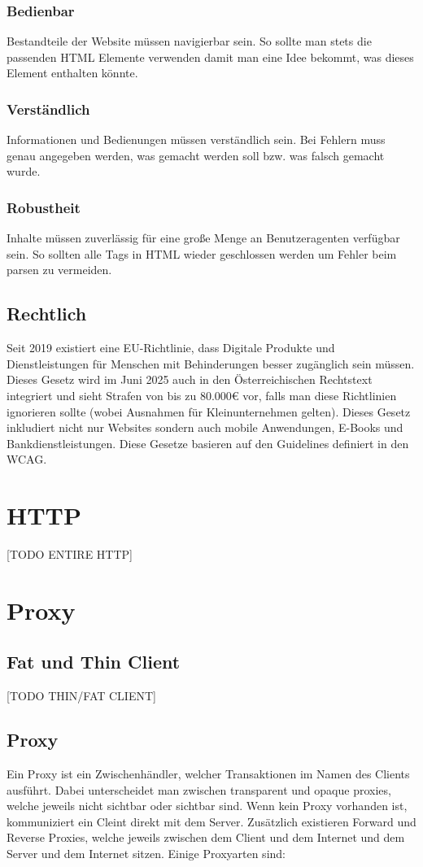\documentclass{article}
\begin{document}
\begin{itemize}
	\subsubsection{Bedienbar}
	Bestandteile der Website müssen navigierbar sein. So sollte man stets die passenden HTML Elemente verwenden damit man eine Idee bekommt, was dieses Element enthalten könnte.
	\subsubsection{Verständlich}
	Informationen und Bedienungen müssen verständlich sein. Bei Fehlern muss genau angegeben werden, was gemacht werden soll bzw. was falsch gemacht wurde.
	\subsubsection{Robustheit}
	Inhalte müssen zuverlässig für eine große Menge an Benutzeragenten verfügbar sein. So sollten alle Tags in HTML wieder geschlossen werden um Fehler beim parsen zu vermeiden.
	\subsection{Rechtlich}
	Seit 2019 existiert eine EU-Richtlinie, dass Digitale Produkte und Dienstleistungen für Menschen mit Behinderungen besser zugänglich sein müssen. Dieses Gesetz wird im Juni 2025 auch in den Österreichischen Rechtstext integriert und sieht Strafen von bis zu 80.000€ vor, falls man diese Richtlinien ignorieren sollte (wobei Ausnahmen für Kleinunternehmen gelten). Dieses Gesetz inkludiert nicht nur Websites sondern auch mobile Anwendungen, E-Books und Bankdienstleistungen. Diese Gesetze basieren auf den Guidelines definiert in den WCAG.
	\section{HTTP}
	[TODO ENTIRE HTTP]
	\section{Proxy}
	\subsection{Fat und Thin Client}
	[TODO THIN/FAT CLIENT]
	\subsection{Proxy}
	Ein Proxy ist ein Zwischenhändler, welcher Transaktionen im Namen des Clients ausführt. Dabei unterscheidet man zwischen transparent und opaque proxies, welche jeweils nicht sichtbar oder sichtbar sind. Wenn kein Proxy vorhanden ist, kommuniziert ein Cleint direkt mit dem Server. Zusätzlich existieren Forward und Reverse Proxies, welche jeweils zwischen dem Client und dem Internet und dem Server und dem Internet sitzen. Einige Proxyarten sind:

\end{itemize}
\end{document}
